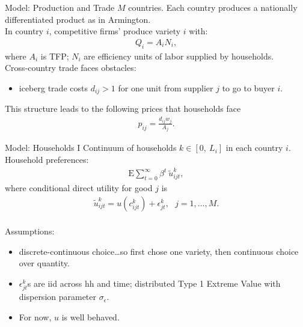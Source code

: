 \documentclass[9pt,pdftex,aspectratio=1610]{beamer}
\theoremstyle{definition}
\begin{document}

\begin{frame}[t]{Model: Production and Trade}
\smallskip
$M$ countries. Each country produces a nationally differentiated product as in Armington.\\
\bigskip
\medskip
In country $i$, competitive firms' produce variety $i$ with:
\begin{align*}
Q_i = A_i N_i,
\end{align*}
where $A_i$ is TFP; $N_i$ are efficiency units of labor supplied by households.\\
\bigskip
\medskip
Cross-country trade faces obstacles:
\begin{itemize}
\smallskip
\item iceberg trade costs $d_{ij} > 1$ for one unit from supplier $j$ to go to buyer $i$.
\end{itemize}
\bigskip
\medskip
This structure leads to the following prices that households face
\begin{align*}
p_{ij} = \frac{d_{ij}w_{j}}{A_{j}}.
\end{align*}
\end{frame}


\begin{frame}[t]{Model: Households I}
\smallskip
Continuum of households $k \in [0, \ L_i]$ in each country $i$. Household preferences:
\begin{align*}
\mathrm{E}\sum_{t = 0}^{\infty} \beta^{t} \ \tilde{u}^k_{ijt},
\end{align*}
where conditional direct utility for good $j$ is
\begin{align*}
\tilde{u}^k_{ijt} =  u(c^k_{ijt}) + \epsilon^k_{jt}, \ \ \ j = 1, \ldots, M.
\end{align*}\\
\medskip
Assumptions:
\begin{itemize}
\item discrete-continuous choice\ldots so first chose one variety, then continuous choice over quantity.
\smallskip
\item $\epsilon^k_{jt}$s are iid across hh and time; distributed Type 1 Extreme Value with dispersion parameter $\sigma_{\epsilon}$.
\smallskip
\item For now, $u$ is well behaved.
\end{itemize}
\end{frame}
\end{document}
